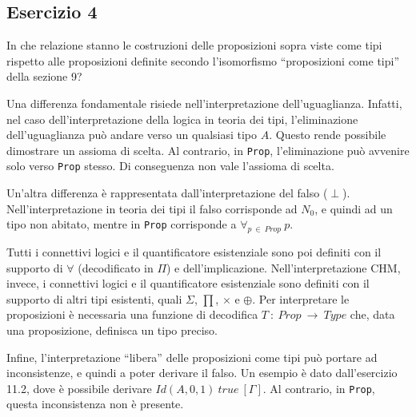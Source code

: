 \subsection{Esercizio 4}
\begin{thm}
	In che relazione stanno le costruzioni delle proposizioni sopra viste come tipi rispetto alle proposizioni definite secondo l'isomorfismo ``proposizioni come tipi'' della sezione 9?
\end{thm}
Una differenza fondamentale risiede nell'interpretazione dell'uguaglianza. Infatti, nel caso dell'interpretazione della logica in teoria dei tipi, l'eliminazione dell'uguaglianza può andare verso un qualsiasi tipo $A$. Questo rende possibile dimostrare un assioma di scelta. Al contrario, in \texttt{Prop}, l'eliminazione può avvenire solo verso \texttt{Prop} stesso. Di conseguenza non vale l'assioma di scelta.

Un'altra differenza è rappresentata dall'interpretazione del falso ($\perp$). Nell'interpretazione in teoria dei tipi il falso corrisponde ad $N_0$, e quindi ad un tipo non abitato, mentre in \texttt{Prop} corrisponde a $\forall_{p~\in~Prop}~p$. 

Tutti i connettivi logici e il quantificatore esistenziale sono poi definiti con il supporto di $\forall$ (decodificato in $\Pi$) e dell'implicazione. Nell'interpretazione CHM, invece, i connettivi logici e il quantificatore esistenziale sono definiti con il supporto di altri tipi esistenti, quali $\Sigma$, $\prod$, $\times$ e $\oplus$. Per interpretare le proposizioni è necessaria una funzione di decodifica $T~:~Prop~\to~Type$ che, data una proposizione, definisca un tipo preciso.

Infine, l'interpretazione ``libera'' delle proposizioni come tipi può portare ad inconsistenze, e quindi a poter derivare il falso. Un esempio è dato dall'esercizio 11.2, dove è possibile derivare $Id(A, 0, 1)~true~[\Gamma]$. Al contrario, in \texttt{Prop}, questa inconsistenza non è presente.
